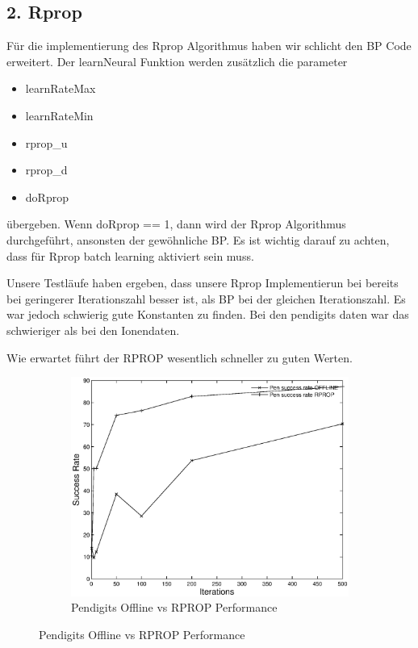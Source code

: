\documentclass{article}
\begin{document}
\subsection*{2. Rprop}
Für die implementierung des Rprop Algorithmus haben wir schlicht den
BP Code erweitert. Der learnNeural Funktion werden zusätzlich die parameter
\begin{itemize}
\item learnRateMax
\item learnRateMin
\item rprop\_u
\item rprop\_d
\item doRprop
\end{itemize}
übergeben. Wenn doRprop == 1, dann wird der Rprop Algorithmus
durchgeführt, ansonsten der gewöhnliche BP. Es ist wichtig darauf zu
achten, dass für Rprop batch learning aktiviert sein muss.

Unsere Testläufe haben ergeben, dass unsere Rprop Implementierun bei
bereits bei geringerer Iterationszahl besser ist, als BP bei der
gleichen Iterationszahl. Es war jedoch schwierig gute Konstanten zu
finden. Bei den pendigits daten war das schwieriger als bei den
Ionendaten.

Wie erwartet führt der RPROP wesentlich schneller zu guten Werten.

	\begin{figure}[H]
	  \begin{subfigure}
	    \centering
	    \includegraphics[scale=0.75]{task2-pen-1.eps}
      \caption{Pendigits Offline vs RPROP Performance}
	  \end{subfigure}
	\end{figure}
\end{document}
